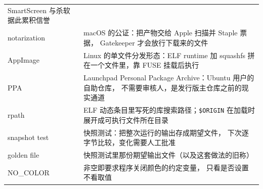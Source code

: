 \documentclass[12pt,a4paper,fontset=fandol]{ctexbook}
\newcommand{\Tp}[1]{\texttt{#1}}
\begin{document}
\begin{longtable}{@{}>{\raggedright\arraybackslash}p{}
                 >{\raggedright\arraybackslash}p{}@{}}
SmartScreen 与杀软据此累积信誉 \\
notarization & macOS 的公证：把产物交给 Apple 扫描并 Staple 票据，
Gatekeeper 才会放行下载来的文件 \\
AppImage & Linux 的单文件分发形态：ELF runtime 加 squashfs
拼在一个文件里，靠 FUSE 挂载后执行 \\
PPA & Launchpad Personal Package Archive：Ubuntu 用户的自助仓库，
不需要审核人，是发行版主仓库之前的现实通道 \\
rpath & ELF 动态条目里写死的库搜索路径；\Tp{\$ORIGIN}
在加载时展开成可执行文件所在目录 \\
snapshot test & 快照测试：把整次运行的输出存成期望文件，
下次逐字节比较，变化需要人工批准 \\
golden file & 快照测试里那份期望输出文件（以及这套做法的旧称） \\
NO\_COLOR & 非空即要求程序关闭颜色的约定变量，
只看是否设置不看取值 \\
\bottomrule
\end{longtable}
\end{document}
